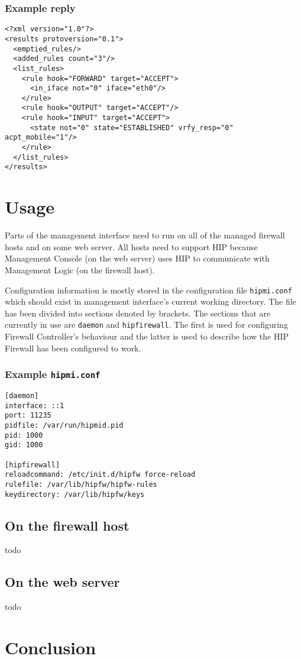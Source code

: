 \documentclass[a4paper,titlepage]{article}
\begin{document}
\subsubsection*{Example reply}

\begin{verbatim}
<?xml version="1.0"?>
<results protoversion="0.1">
  <emptied_rules/>
  <added_rules count="3"/>
  <list_rules>
    <rule hook="FORWARD" target="ACCEPT">
      <in_iface not="0" iface="eth0"/>
    </rule>
    <rule hook="OUTPUT" target="ACCEPT"/>
    <rule hook="INPUT" target="ACCEPT">
      <state not="0" state="ESTABLISHED" vrfy_resp="0" acpt_mobile="1"/>
    </rule>
  </list_rules>
</results>
\end{verbatim}

\section{Usage}

Parts of the management interface need to run on all of the managed
firewall hosts and on some web server. All hosts need to support HIP
because Management Console (on the web server) uses HIP to communicate
with Management Logic (on the firewall host).

Configuration information is mostly stored in the configuration file
\texttt{hipmi.conf} which should exist in management interface's
current working directory. The file has been divided into sections
denoted by brackets. The sections that are currently in use are
\texttt{daemon} and \texttt{hipfirewall}. The first is used for configuring
Firewall Controller's behaviour and the latter is used to describe how
the HIP Firewall has been configured to work.

\subsubsection*{Example \texttt{hipmi.conf}}

\begin{verbatim}
[daemon]
interface: ::1
port: 11235
pidfile: /var/run/hipmid.pid
pid: 1000
gid: 1000

[hipfirewall]
reloadcommand: /etc/init.d/hipfw force-reload
rulefile: /var/lib/hipfw/hipfw-rules
keydirectory: /var/lib/hipfw/keys
\end{verbatim}

\subsection{On the firewall host}

todo

\subsection{On the web server}

todo

\section{Conclusion}





\appendix
\newpage
\end{document}
